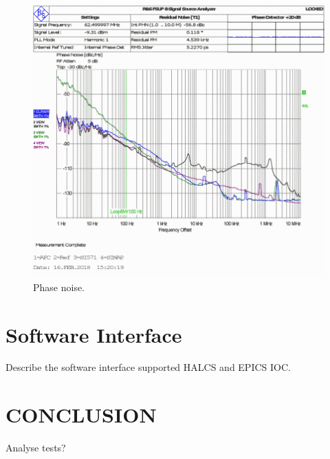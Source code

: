 \documentclass[a4paper,
               biblatex,      %
               ]{jacow}
\begin{document}
\begin{figure}[!htb]
   \centering
   \includegraphics*[width=0.8\columnwidth]{AFC_TIMING_SI571}
   \caption{Phase noise.}
   \label{fig:AFCPhaseNoise}
\end{figure}

\section{Software Interface}
Describe the software interface supported HALCS and EPICS IOC.

\section{CONCLUSION}

Analyse tests?

\printbibliography
\newpage
\end{document}
